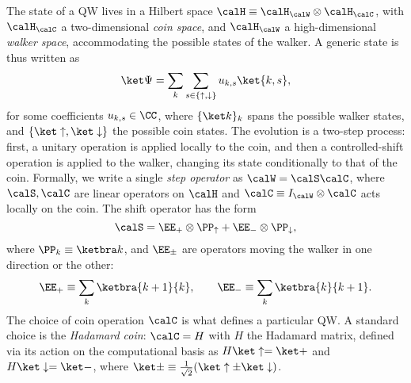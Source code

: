 The state of a QW lives in a Hilbert space $\calH\equiv\calH_{\calW}\otimes\calH_{\calC}$, with $\calH_{\calC}$ a two-dimensional \emph{coin space}, and $\calH_{\calW}$ a high-dimensional \emph{walker space}, accommodating the possible states of the walker.
A generic state is thus written as
\begin{equation}
    \ket\Psi = \sum_k \sum_{s\in\{\uparrow,\downarrow\}} u_{k,s} \ket{k, s},
\end{equation}
for some coefficients $u_{k,s}\in\CC$, where $\{\ket k\}_k$ spans the possible walker states, and $\{\ket\uparrow, \ket\downarrow\}$ the possible coin states.
The evolution is a two-step process:
first, a unitary operation is applied locally to the coin,
and then a controlled-shift operation is applied to the walker, changing its state conditionally to that of the coin.
Formally, we write a single \textit{step operator} as $\calW=\calS\calC$, where $\calS,\calC$ are linear operators on $\calH$ and $\calC\equiv I_{\calW}\otimes \calC$ acts locally on the coin. The shift operator has the form
\begin{equation}
    \calS = \EE_+\otimes \PP_\uparrow + \EE_-\otimes \PP_\downarrow,
    \label{eq:qws_shitty_definition_cshift}
\end{equation}
where $\PP_k\equiv\ketbra k$, and $\EE_\pm$ are operators moving the walker in one direction or the other:
\begin{equation}
    \EE_+\equiv \sum_k \ketbra{k+1}{k},
    \qquad
    \EE_-\equiv\sum_k\ketbra{k}{k+1}.
\end{equation}
The choice of coin operation $\calC$ is what defines a particular \ac{QW}.
A standard choice is the \textit{Hadamard coin}: $\calC=H$ with $H$ the Hadamard matrix, defined via its action on the computational basis as
$H\ket\uparrow=\ket+$ and $H\ket\downarrow=\ket-$, where $\ket\pm\equiv\frac{1}{\sqrt2}(\ket\uparrow\pm\ket\downarrow)$.

